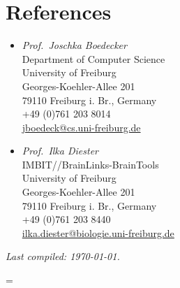 \documentclass{article}
\begin{document}
\section{References}
\begin{itemize}
    \item \textsl{Prof.~Joschka Boedecker}\\
        Department of Computer Science\\
        University of Freiburg\\
        Georges-Koehler-Allee 201\\
        79110 Freiburg i. Br., Germany\\
        +49 (0)761 203 8014\\
        \href{mailto:jboedeck@cs.uni-freiburg.de}{jboedeck@cs.uni-freiburg.de}\\
    \item \textsl{Prof.~Ilka Diester}\\
        IMBIT//BrainLinks-BrainTools\\
        University of Freiburg\\
        Georges-Koehler-Allee 201\\
        79110 Freiburg i. Br., Germany\\
        +49 (0)761 203 8440\\
        \href{mailto:ilka.diester@biologie.uni-freiburg.de}{ilka.diester@biologie.uni-freiburg.de}
\end{itemize}

\vspace*{\fill}
\begin{center}
    {\itshape Last compiled: \today.}
\end{center}
\vspace*{\fill}

\begingroup
  =\vbox{}
\endgroup
\end{document}
